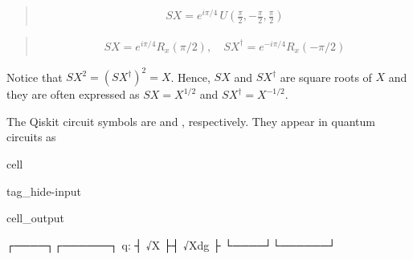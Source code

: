\documentclass[letterpaper,10pt,english]{jupyterBook}
\begin{document}
\sphinxAtStartPar
{}
\begin{quote}
\begin{equation*}
\begin{split}
SX = e^{i \pi/4}\, U\left(\frac{\pi}{2}, -\frac{\pi}{2}, \frac{\pi}{2} \right)
\end{split}
\end{equation*}\end{quote}

\sphinxAtStartPar
{}
\begin{quote}
\begin{equation*}
\begin{split}
SX = e^{i \pi/4} R_x(\pi/2), \quad SX^\dagger = e^{-i \pi/4} R_x(-\pi/2)
\end{split}
\end{equation*}\end{quote}

\sphinxAtStartPar
Notice that \(SX^2 = (SX^\dagger)^2 = X\).  Hence, \(SX\) and \(SX^\dagger\) are square roots of \(X\) and they are often expressed as  \(SX=X^{1/2}\) and \(SX^\dagger = X^{-1/2}\).

\sphinxAtStartPar
The Qiskit circuit symbols are  and , respectively. They appear in quantum circuits as

\begin{sphinxuseclass}{cell}
\begin{sphinxuseclass}{tag_hide-input}\begin{sphinxVerbatimOutput}

\begin{sphinxuseclass}{cell_output}
\begin{sphinxVerbatim}[commandchars=\\\{\}]
   ┌────┐┌──────┐
q: ┤ √X ├┤ √Xdg ├
   └────┘└──────┘
\end{sphinxVerbatim}

\end{sphinxuseclass}\end{sphinxVerbatimOutput}

\end{sphinxuseclass}
\end{sphinxuseclass}
\end{document}
